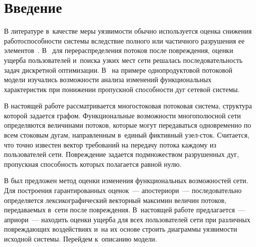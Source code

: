 
  
\vspace*{-6pt}



\thispagestyle{headings}

\begin{multicols}{2}

\label{st\stat}

\section{Введение}

В литературе в~качестве меры уязвимости обычно используется оценка снижения  
работоспособности системы вследствие полного или частичного  разрушения ее  
элементов~\cite{Mur13}. В~\cite{Naz03, Naz06} для перераспределения потоков после 
повреждения, оценки ущерба  пользователей и~поиска узких мест сети решалась 
последовательность задач дискретной оптимизации. В~\cite{Mal17} на примере 
однопродуктовой потоковой модели изучались возможности анализа изменений 
функциональных характеристик при понижении пропускной способности дуг  
сетевой системы.

В настоящей работе рассматривается многостоковая  потоковая система, 
структура которой задается графом. Функциональные возможности многополюсной  
сети определяются величинами потоков, которые могут  передаваться одновременно 
по всем стоковым дугам, направленным в~единый фиктивный узел-сток. Считается, 
что точно известен  вектор требований на передачу потока  каждому из пользователей 
сети. Повреждение задается подмножеством разрушенных дуг, пропускная способность 
которых полагается  равной   нулю.

В \cite{MalInf17} был предложен метод оценки изменения функциональных возможностей 
сети. Для по\-стро\-ения  гарантированных оценок~---  апостериори~---   
последовательно  определяется лексикографический векторный  максимин величин потоков, 
пе\-ре\-да\-ва\-емых в~сети после повреждения.   В~настоящей работе предлагается~--- априори~--- 
находить оценки  ущерба для всех пользователей сети при различных  по\-вреж\-да\-ющих 
воздействиях и~на их основе строить диаграммы уязвимости исходной системы. 
Перейдем к~описанию модели. 

\vspace*{-9pt}


\end{multicols}
